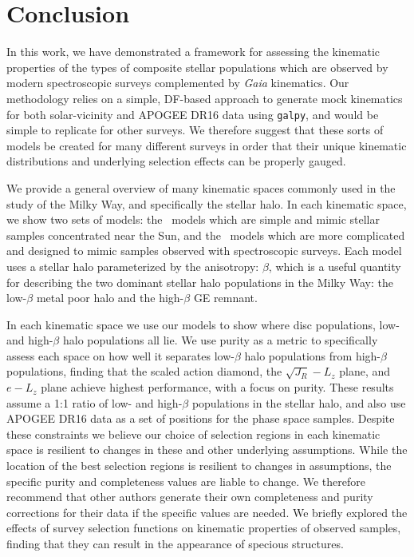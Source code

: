 \section{Conclusion}

In this work, we have demonstrated a framework for assessing the kinematic properties of the types of composite stellar populations which are observed by modern spectroscopic surveys complemented by \textit{Gaia} kinematics. Our methodology relies on a simple, DF-based approach to generate mock kinematics for both solar-vicinity and APOGEE DR16 data using \texttt{galpy}, and would be simple to replicate for other surveys. We therefore suggest that these sorts of models be created for many different surveys in order that their unique kinematic distributions and underlying selection effects can be properly gauged.

We provide a general overview of many kinematic spaces commonly used in the study of the Milky Way, and specifically the stellar halo. In each kinematic space, we show two sets of models: the \solar\ models which are simple and mimic stellar samples concentrated near the Sun, and the \survey\ models which are more complicated and designed to mimic samples observed with spectroscopic surveys. Each model uses a stellar halo parameterized by the anisotropy: $\beta$, which is a useful quantity for describing the two dominant stellar halo populations in the Milky Way: the low-$\beta$ metal poor halo and the high-$\beta$ GE remnant.

In each kinematic space we use our models to show where disc populations, low- and high-$\beta$ halo populations all lie. We use purity as a metric to specifically assess each space on how well it separates low-$\beta$ halo populations from high-$\beta$ populations, finding that the scaled action diamond, the $\sqrt{J_{R}}-L_{z}$ plane, and $e-L_{z}$ plane achieve highest performance, with a focus on purity. These results assume a 1:1 ratio of low- and high-$\beta$ populations in the stellar halo, and also use APOGEE DR16 data as a set of positions for the phase space samples. Despite these constraints we believe our choice of selection regions in each kinematic space is resilient to changes in these and other underlying assumptions. While the location of the best selection regions is resilient to changes in assumptions, the specific purity and completeness values are liable to change. We therefore recommend that other authors generate their own completeness and purity corrections for their data if the specific values are needed. We briefly explored the effects of survey selection functions on kinematic properties of observed samples, finding that they can result in the appearance of specious structures.

